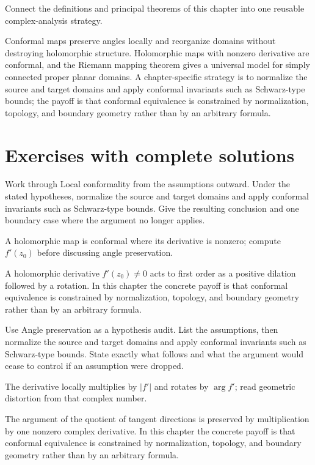 \begin{problem}\label{prob:iv17-problem-12}
Connect the definitions and principal theorems of this chapter into one reusable complex-analysis strategy.
\end{problem}
\begin{solution}
Conformal maps preserve angles locally and reorganize domains without destroying holomorphic structure. Holomorphic maps with nonzero derivative are conformal, and the Riemann mapping theorem gives a universal model for simply connected proper planar domains. A chapter-specific strategy is to normalize the source and target domains and apply conformal invariants such as Schwarz-type bounds; the payoff is that conformal equivalence is constrained by normalization, topology, and boundary geometry rather than by an arbitrary formula.
\end{solution}

\section{Exercises with complete solutions}

\begin{exercise}\label{exr:iv17-01}
Work through Local conformality from the assumptions outward. Under the stated hypotheses, normalize the source and target domains and apply conformal invariants such as Schwarz-type bounds. Give the resulting conclusion and one boundary case where the argument no longer applies.
\end{exercise}
\begin{hint}
A holomorphic map is conformal where its derivative is nonzero; compute \(f'(z_0)\) before discussing angle preservation.
\end{hint}
\begin{solution}
A holomorphic derivative $f'(z_0)\ne0$ acts to first order as a positive dilation followed by a rotation. In this chapter the concrete payoff is that conformal equivalence is constrained by normalization, topology, and boundary geometry rather than by an arbitrary formula.
\end{solution}

\begin{exercise}\label{exr:iv17-02}
Use Angle preservation as a hypothesis audit. List the assumptions, then normalize the source and target domains and apply conformal invariants such as Schwarz-type bounds. State exactly what follows and what the argument would cease to control if an assumption were dropped.
\end{exercise}
\begin{hint}
The derivative locally multiplies by \(|f'|\) and rotates by \(\arg f'\); read geometric distortion from that complex number.
\end{hint}
\begin{solution}
The argument of the quotient of tangent directions is preserved by multiplication by one nonzero complex derivative. In this chapter the concrete payoff is that conformal equivalence is constrained by normalization, topology, and boundary geometry rather than by an arbitrary formula.
\end{solution}

